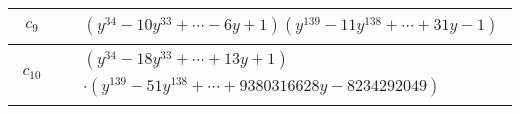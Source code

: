 \documentclass[1p]{elsarticle_modified}
\theoremstyle{definition}
\begin{document}
\begin{tabular}{m{50pt}|m{274pt}}
\hline $$\begin{aligned}c_{9}\end{aligned}$$&$\begin{aligned}
&(y^{34}-10 y^{33}+\cdots-6 y+1)(y^{139}-11 y^{138}+\cdots+31 y-1)
\end{aligned}$\\
\hline $$\begin{aligned}c_{10}\end{aligned}$$&$\begin{aligned}
&(y^{34}-18 y^{33}+\cdots+13 y+1)\\
&\cdot(y^{139}-51 y^{138}+\cdots+9380316628 y-8234292049)
\end{aligned}$\\
\hline
\end{tabular}
\vskip 2pc
\end{document}
